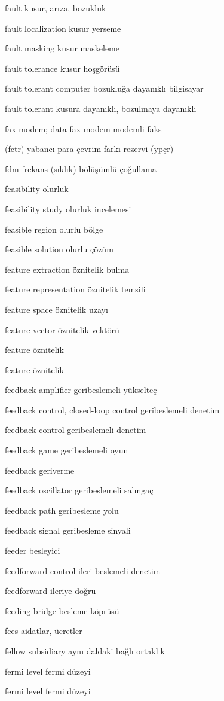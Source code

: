 \documentclass[12pt,fleqn]{article}\usepackage{../../common}
\begin{document}
fault kusur, arıza, bozukluk

fault localization kusur yerseme

fault masking kusur maskeleme

fault tolerance kusur hoşgörüsü

fault tolerant computer bozukluğa dayanıklı bilgisayar

fault tolerant kusura dayanıklı, bozulmaya dayanıklı

fax modem; data fax modem modemli faks

(fctr) yabancı para çevrim farkı rezervi (ypçr)

fdm frekans (sıklık) bölüşümlü çoğullama

feasibility olurluk

feasibility study olurluk incelemesi

feasible region olurlu bölge

feasible solution olurlu çözüm

feature extraction öznitelik bulma

feature representation öznitelik temsili

feature space öznitelik uzayı

feature vector öznitelik vektörü

feature öznitelik

feature öznitelik

feedback amplifier geribeslemeli yükselteç

feedback control, closed-loop control geribeslemeli denetim

feedback control geribeslemeli denetim

feedback game geribeslemeli oyun

feedback geriverme

feedback oscillator geribeslemeli salıngaç

feedback path geribesleme yolu

feedback signal geribesleme sinyali

feeder besleyici

feedforward control ileri beslemeli denetim

feedforward ileriye doğru

feeding bridge besleme köprüsü

fees aidatlar, ücretler

fellow subsidiary aynı daldaki bağlı ortaklık

fermi level fermi düzeyi

fermi level fermi düzeyi
\end{document}
